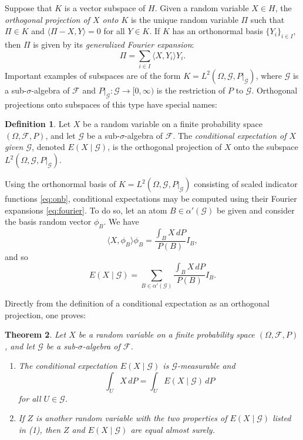 \documentclass[reqno]{amsart}
\newtheorem{thm}{Theorem}[section]
\theoremstyle{definition}
\newtheorem{defn}[thm]{Definition}
\numberwithin{equation}{section}
\begin{document}
Suppose that $K$ is a vector subspace of $H$. Given a random variable $X\in H$, the \textit{orthogonal projection of $X$ onto $K$} is the unique random variable $\Pi$ such that $\Pi\in K$ and $\langle \Pi-X, Y \rangle = 0$ for all $Y\in K$. If $K$ has an orthonormal basis $\{Y_i\}_{i\in I}$, then $\Pi$ is given by its \textit{generalized Fourier expansion}:
	\begin{equation}\label{eq:fourier}
	\Pi = \sum_{i\in I} \langle X, Y_i \rangle Y_i.
	\end{equation}
Important examples of subspaces are of the form $K = L^2(\Omega, \mathcal{G}, P|_{\mathcal{G}})$, where $\mathcal{G}$ is a sub-$\sigma$-algebra of $\mathcal{F}$ and $P|_{\mathcal{G}}: \mathcal{G} \to [0,\infty)$ is the restriction of $P$ to $\mathcal{G}$. Orthogonal projections onto subspaces of this type have special names:

\begin{defn}
Let $X$ be a random variable on a finite probability space $(\Omega, \mathcal{F}, P)$, and let $\mathcal{G}$ be a sub-$\sigma$-algebra of $\mathcal{F}$. The \textit{conditional expectation of $X$ given $\mathcal{G}$}, denoted $E(X \mid \mathcal{G})$, is the orthogonal projection of $X$ onto the subspace $L^2(\Omega, \mathcal{G}, P|_{\mathcal{G}})$.
\end{defn}

Using the orthonormal basis of $K=L^2(\Omega, \mathcal{G}, P|_{\mathcal{G}})$ consisting of scaled indicator functions \eqref{eq:onb}, conditional expectations may be computed using their Fourier expansions \eqref{eq:fourier}. To do so, let an atom $B\in \alpha'(\mathcal{G})$ be given and consider the basis random vector $\phi_B$. We have
	\[
	\langle X, \phi_B \rangle \phi_B = \frac{\int_B X \, dP}{P(B)}  I_B,
	\]
and so
	\[
	E(X \mid \mathcal{G}) = \sum_{B \in \alpha'(\mathcal{G})} \frac{\int_B X \, dP}{P(B)}  I_B.
	\]
	
Directly from the definition of a conditional expectation as an orthogonal projection, one proves:

\begin{thm}
Let $X$ be a random variable on a finite probability space $(\Omega, \mathcal{F}, P)$, and let $\mathcal{G}$ be a sub-$\sigma$-algebra of $\mathcal{F}$.
\begin{enumerate}
\item The conditional expectation $E(X\mid \mathcal{G})$ is $\mathcal{G}$-measurable and
	\[
	\int_U X \, dP = \int_U E(X\mid \mathcal{G}) \, dP
	\]
for all $U\in \mathcal{G}$.
\item If $Z$ is another random variable with the two properties of $E(X\mid \mathcal{G})$ listed in (1), then $Z$ and $E(X\mid \mathcal{G})$ are equal almost surely.
\end{enumerate}
\end{thm}
\end{document}
